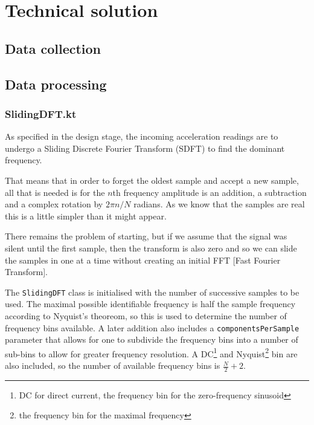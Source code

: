\documentclass[11pt,twoside,a4paper]{report}
\begin{document}
\chapter{Technical solution}

\section{Data collection}

\section{Data processing}

\subsection{SlidingDFT.kt}

As specified in the design stage, the incoming acceleration readings are to undergo a Sliding Discrete Fourier Transform (SDFT) to find the dominant frequency.

\begin{displayquote}
  That means that in order to forget the oldest sample and accept a new sample, all that is needed is for the $n$th frequency amplitude is an addition, a subtraction and a complex rotation by $2\pi n / N$ radians. As we know that the samples are real this is a little simpler than it might appear.

  There remains the problem of starting, but if we assume that the signal was silent until the first sample, then the transform is also zero and so we can slide the samples in one at a time without creating an initial FFT [Fast Fourier Transform].
\end{displayquote}

The \texttt{SlidingDFT} class is initialised with the number of successive samples to be used. The maximal possible identifiable frequency is half the sample frequency according to Nyquist's theoreom, so this is used to determine the number of frequency bins available. A later addition also includes a \texttt{componentsPerSample} parameter that allows for one to subdivide the frequency bins into a number of sub-bins to allow for greater frequency resolution. A DC\footnote{DC for direct current, the frequency bin for the zero-frequency sinusoid} and Nyquist\footnote{the frequency bin for the maximal frequency} bin are also included, so the number of available frequency bins is $\frac{N}{2} + 2$.
\end{document}
